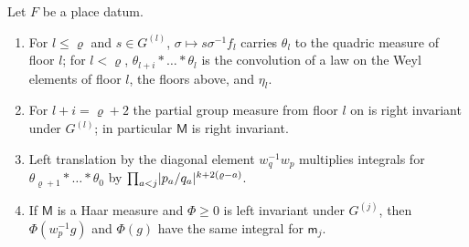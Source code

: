 \begin{proposition}\label{prop:floor-measures}
Let $F$ be a place datum.
\begin{enumerate}[label=\textup{(\alph*)}]
\item For $l\le\varrho$ and $s\in G^{(l)}$, $\sigma\mapsto s\sigma^{-1}f_l$ carries $\theta_l$ to the quadric measure of floor $l$; for $l<\varrho$, $\theta_{l+i}*\dots*\theta_l$ is the convolution of a law on the Weyl
elements of floor $l$, the floors above, and $\eta_l$.
\item For $l+i=\varrho+2$ the partial group measure from floor $l$ on is right invariant under $G^{(l)}$; in particular $\mathsf M$ is right invariant.
\item Left translation by the diagonal element $w_q^{-1}w_p$ multiplies integrals for $\theta_{\varrho+1}*\dots*\theta_0$ by $\prod_{a<j}\lvert p_a/q_a\rvert^{k+2(\varrho-a)}$.
\item If $\mathsf M$ is a Haar measure and $\Phi\ge0$ is left invariant under $G^{(j)}$, then $\Phi(w_p^{-1}g)$ and $\Phi(g)$ have the same integral for $\mathsf m_j$.
\end{enumerate}
\end{proposition}

